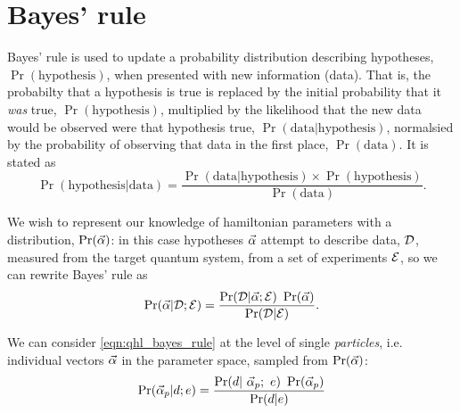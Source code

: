 \section{Bayes' rule}
Bayes' rule is used to update a probability distribution describing hypotheses, $\Pr(\textrm{hypothesis})$, when presented with new information (data).
That is, the probabilty that a hypothesis is true is replaced
    by the initial probability that it \emph{was} true, $\Pr(\textrm{hypothesis})$, multiplied by 
    the  \gls{likelihood} that the new data would be observed were that hypothesis true, 
    $\Pr(\textrm{data} | \textrm{hypothesis})$, 
    normalsied by the probability of observing that data in the first place, $\Pr(\textrm{data})$. 
It is stated as
    \begin{equation}\label{eqn:bayes_rule}
        \Pr( \textrm{hypothesis} | \textrm{data} ) = 
        \frac{ \Pr( \textrm{data} | \textrm{hypothesis} ) \times \Pr( \textrm{hypothesis} )}{ \Pr(\textrm{data})}.
    \end{equation}
\par 
We wish to represent our knowledge of \gls{hamiltonian} parameters with a distribution, $\Pr(\vec{\alpha})$:
    in this case hypotheses $\vec{\alpha}$ attempt to describe data, ${ \mathcal{D} }$, measured from the target quantum system,  
    from a set of \glspl{experiment} ${ \mathcal{E} }$, so we can rewrite Bayes' rule as 
\begin{equation}\label{eqn:qhl_bayes_rule}
    \Pr(\vec{\alpha} | \expdata; \expset) = \frac{\Pr(\expdata| \vec{\alpha}; \expset) \ \Pr(\vec{\alpha})}{\Pr(\expdata|\expset)}.
\end{equation}

We can consider \cref{eqn:qhl_bayes_rule} at the level of single \emph{\glspl{particle}}, 
    i.e. individual vectors $\vec{\alpha}$ in the parameter space, 
    sampled from $\Pr(\vec{\alpha})$:
    \begin{equation}\label{eqn:particle_bayes_rule}
        \Pr(\vec{\alpha}_p | d; e) = \frac{ \Pr(d | \ \vec{\alpha}_p; \ e ) \ \Pr(\vec{\alpha}_p) } {\Pr(d | e)}
    \end{equation}

